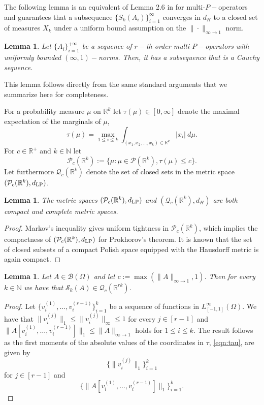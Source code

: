 \documentclass[11pt]{article}
\newtheorem{lemma}[theorem]{Lemma}
\begin{document}
The following lemma is an equivalent of Lemma 2.6 in \cite{backhausz2018action} for multi-$P-$operators and guarantees that a subsequence $\{{S_k\left(A_i\right)}\}^{\infty}_{i=1}$ converges in $d_H$ to a closed set of measures $X_k$ under a uniform bound assumption on the $\|\cdot\|_{\infty\rightarrow 1}$ norm.
 
\begin{lemma}
Let $\{A_i\}^{+\infty}_{i=1}$ be a sequence of $r-$th order multi-$P-$operators with uniformly bounded $(\infty,1)-$norms. Then, it has a subsequence that is a Cauchy sequence.
\end{lemma}

This lemma follows directly from the same standard arguments that we summarize here for completeness.

For a probability measure $\mu$ on $\mathbb{R}^k$ let $\tau(\mu)\in [0,\infty]$ denote the maximal expectation of the marginals of $\mu$,
\begin{equation}\label{eqn:tau}\tau(\mu)=\max_{1\leq i\leq k} \int_{(x_1,x_2,\dots,x_k)\in\mathbb{R}^k}|x_i|~d\mu.\end{equation} For $c\in\mathbb{R}^+$ and $k\in\mathbb{N}$ let 
$$\mathcal{P}_c(\mathbb{R}^k):=\{\mu : \mu\in\mathcal{P}(\mathbb{R}^k) , \tau(\mu)\leq c\}.$$
Let furthermore $\mathcal{Q}_c(\mathbb{R}^k)$ denote the set of closed sets in the metric space $(\mathcal{P}_c(\mathbb{R}^k),d_{\rm LP})$. 

\begin{lemma} The metric spaces $(\mathcal{P}_c(\mathbb{R}^k),d_{\rm LP})$ and $(\mathcal{Q}_c(\mathbb{R}^k),d_H)$ are both compact and complete metric spaces.
\end{lemma}

\begin{proof} Markov's inequality gives uniform tightness in $\mathcal{P}_c(\mathbb{R}^k)$, which implies the compactness of $(\mathcal{P}_c(\mathbb{R}^k),d_{\rm LP})$ for Prokhorov's theorem. It is known that the set of closed subsets of a compact Polish space equipped with the Hausdorff metric is again compact.
\end{proof}


\begin{lemma} Let $A\in\mathcal{B}(\Omega)$ and let $c:=\max(\|A\|_{\infty\to1},1)$. Then for every $k\in\mathbb{N}$ we have that $\mathcal{S}_k(A)\in \mathcal{Q}_c(\mathbb{R}^{rk})$.
\end{lemma}

\begin{proof} Let $\{v^{(1)}_i,\ldots,v_i^{(r-1)}\}_{i=1}^k$ be a sequence of functions in $L^\infty_{[-1,1]}(\Omega)$. We have that $\|v^{(j)}_i\|_1\leq \|v^{(j)}_i\|_\infty\leq 1$ for every $j\in[r-1]$ and $\|A[v^{(1)}_i,\ldots,v^{(r-1)}_i ]\|_1\leq \|A\|_{\infty\to 1}$  holds for $1\leq i\leq k$. The result follows as the first moments of the absolute values of the coordinates in $\tau$, \eqref{eqn:tau}, are given by $$\{\|v^{(j)}_i\|_1\}_{i=1}^k$$ for $j\in [r-1]$ and $$\{\|A[v^{(1)}_i,\ldots,v^{(r-1)}_i]\|_1\}_{i=1}^k.$$
\end{proof}
\end{document}
